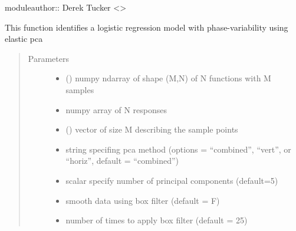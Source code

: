 \documentclass[letterpaper,10pt,english]{sphinxmanual}
\begin{document}
moduleauthor:: Derek Tucker \textless{}\textgreater{}

\begin{fulllineitems}
\label{\detokenize{pcr_regression:pcr_regression.elastic_lpcr_regression}}
This function identifies a logistic regression model with phase-variability
using elastic pca
\begin{quote}\begin{description}
\item[{Parameters}] \leavevmode\begin{itemize}
\item {} 
 () \textendash{} numpy ndarray of shape (M,N) of N functions with M samples

\item {} 
 \textendash{} numpy array of N responses

\item {} 
 () \textendash{} vector of size M describing the sample points

\item {} 
 \textendash{} string specifing pca method (options = “combined”,
“vert”, or “horiz”, default = “combined”)

\item {} 
 \textendash{} scalar specify number of principal components (default=5)

\item {} 
 \textendash{} smooth data using box filter (default = F)

\item {} 
 \textendash{} number of times to apply box filter (default = 25)

\end{itemize}


\end{description}
\end{quote}
\end{fulllineitems}
\end{document}
